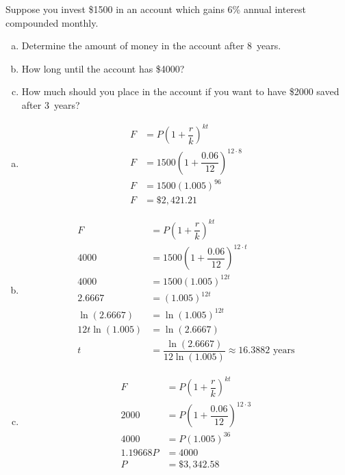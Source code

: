 \documentclass[11pt,letterpaper]{article}
\begin{document}

 Suppose you invest \$1500 in an account which gains 6\% annual interest compounded monthly. 
        \begin{enumerate}[(a)]
        \item Determine the amount of money in the account after 8~years.
        \item How long until the account has \$4000?
        \item How much should you place in the account if you want to have \$2000 saved after 3~years?
        \end{enumerate} \pspace

\sol 
\begin{enumerate}[(a)]
\item 
	\[
	\begin{aligned}
	F&= P \left( 1 + \dfrac{r}{k} \right)^{kt} \\
	F&= 1500 \left( 1 + \dfrac{0.06}{12} \right)^{12 \cdot 8} \\
	F&= 1500 (1.005)^{96} \\
	F&= \$2,421.21
	\end{aligned}
	\] \pspace

\item 
	\[
	\begin{aligned}
	F&= P \left( 1 + \dfrac{r}{k} \right)^{kt} \\
	4000&= 1500 \left( 1 + \dfrac{0.06}{12} \right)^{12 \cdot t} \\
	4000&= 1500 (1.005)^{12t} \\
	2.6667&= (1.005)^{12t} \\
	\ln(2.6667)&= \ln(1.005)^{12t} \\
	12t \ln(1.005)&= \ln(2.6667) \\
	t&= \dfrac{\ln(2.6667)}{12 \ln(1.005)} \approx 16.3882 \text{ years}
	\end{aligned}
	\] \pspace

\item 
	\[
	\begin{aligned}
	F&= P \left( 1 + \dfrac{r}{k} \right)^{kt} \\
	2000&= P \left( 1 + \dfrac{0.06}{12} \right)^{12 \cdot 3} \\
	4000&= P (1.005)^{36} \\
	1.19668P&= 4000 \\
	P&= \$3,342.58
	\end{aligned}
	\]
\end{enumerate}
\end{document}
